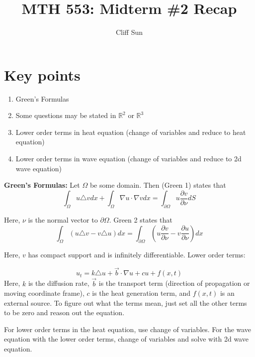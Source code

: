 \documentclass{article}
\title{MTH 553: Midterm \#2 Recap}
\author{Cliff Sun}
\newtheorem{one minute paper}[theorem]{One Minute Paper}
\begin{document}
\maketitle

\section*{Key points}
\begin{enumerate}
    \item Green's Formulas
    \item Some questions may be stated in $\mathbb{R}^2$ or $\mathbb{R}^3$
    \item Lower order terms in heat equation (change of variables and reduce to heat equation)
    \item Lower order terms in wave equation (change of variables and reduce to 2d wave equation)
\end{enumerate}

\textbf{Green's Formulas:} Let $\Omega$ be some domain. Then (Green 1) states that 
\begin{equation}
    \int_{\Omega}u \triangle v dx + \int_{\Omega}\nabla u \cdot \nabla v dx = \int_{\partial \Omega}u\frac{\partial v}{\partial \nu}dS
\end{equation}

Here, $\nu$ is the normal vector to $\partial \Omega$. Green 2 states that 
\begin{equation}
    \int_{\Omega}\left( u\triangle v - v \triangle u \right)dx = \int_{\partial\Omega}\left( u\frac{\partial v}{\partial \nu} - v\frac{\partial u}{\partial \nu} \right)dx
\end{equation}

Here, $v$ has compact support and is infinitely differentiable. Lower order terms:

\begin{equation}
    u_t = k \triangle u + \vec{b} \cdot \nabla u+ cu + f(x,t)
\end{equation}
Here, $k$ is the diffusion rate, $\vec{b}$ is the transport term (direction of propagation or moving coordinate frame), $c$ is the heat generation term, and $f(x,t)$ is an external source. To figure out what the 
terms mean, just set all the other terms to be zero and reason out the equation. 

For lower order terms in the heat equation, use change of variables. For the wave equation with the lower order terms, change of variables and solve with 2d wave equation.
\end{document}
